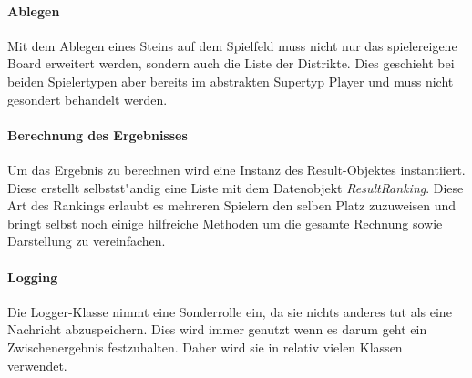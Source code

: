 \paragraph{Ablegen}
Mit dem Ablegen eines Steins auf dem Spielfeld muss nicht nur das spielereigene Board erweitert werden, sondern auch die Liste der Distrikte. Dies geschieht bei beiden Spielertypen aber bereits im abstrakten Supertyp Player und muss nicht gesondert behandelt werden. 

\paragraph{Berechnung des Ergebnisses}
Um das Ergebnis zu berechnen wird eine Instanz des Result-Objektes instantiiert. Diese erstellt selbstst"andig eine Liste mit dem Datenobjekt \emph{ResultRanking}. Diese Art des Rankings erlaubt es mehreren Spielern den selben Platz zuzuweisen und bringt selbst noch einige hilfreiche Methoden um die gesamte Rechnung sowie Darstellung zu vereinfachen. 

\paragraph{Logging}
Die Logger-Klasse nimmt eine Sonderrolle ein, da sie nichts anderes tut als eine Nachricht abzuspeichern. Dies wird immer genutzt wenn es darum geht ein Zwischenergebnis festzuhalten. Daher wird sie in relativ vielen Klassen verwendet. 
